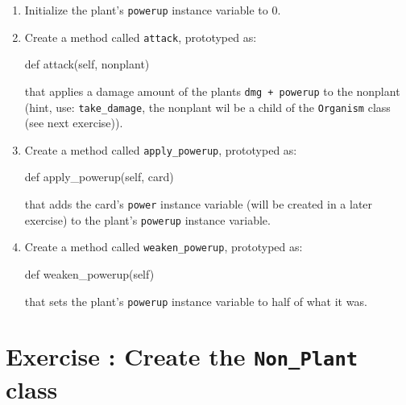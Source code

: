\documentclass{42-en}
\begin{document}
\begin{enumerate}
                \item Initialize the plant's \texttt{powerup} instance variable to 0.
                \item Create a method called \texttt{attack}, prototyped as:
                \begin{42pycode}
def attack(self, nonplant)
\end{42pycode}
                that applies a damage amount of the plants \texttt{dmg + powerup} to the nonplant 
               \\ 
                (hint, use: \texttt{take\_damage}, the nonplant wil be a child of the \texttt{Organism} class (see next exercise)).
                \item Create a method called \texttt{apply\_powerup}, prototyped as:
                \begin{42pycode}
def apply_powerup(self, card)
\end{42pycode}
                that adds the card's \texttt{power} instance variable (will be created in a later exercise) to the plant's \texttt{powerup} instance variable.
                \item Create a method called \texttt{weaken\_powerup}, prototyped as:
                \begin{42pycode}
def weaken_powerup(self)
\end{42pycode}
                that sets the plant's \texttt{powerup} instance variable to half of what it was.
            \end{enumerate}
\nextexercice
\chapter{Exercise \exercicenumber: Create the \texttt{Non\_Plant} class}

\exnumber{\exercicenumber}

\makeheaderfiles
\end{document}
